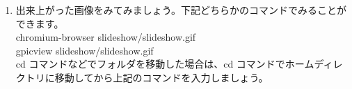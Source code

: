 \begin{enumerate}
\item 出来上がった画像をみてみましょう。下記どちらかのコマンドでみることができます。\\
chromium-browser slideshow/slideshow.gif\\
gpicview slideshow/slideshow.gif\\
cd コマンドなどでフォルダを移動した場合は、cd コマンドでホームディレクトリに移動してから上記のコマンドを入力しましょう。
\end{enumerate}

\begin{tcolorbox}[title=\useOmetoi]
\begin{enumerate}
\end{enumerate}
\end{tcolorbox}
